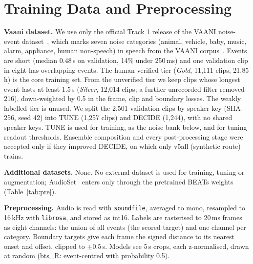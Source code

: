 \documentclass[conference,10pt]{IEEEtran}
\begin{document}
\section{Training Data and Preprocessing}
\textbf{Vaani dataset.} We use only the official Track 1 release of the VAANI noise-event dataset~\cite{vaani_ned}, which marks seven noise categories (animal, vehicle, baby, music, alarm, appliance, human non-speech) in speech from the VAANI corpus~\cite{vaani}. Events are short (median 0.48\,s on validation, 14\% under 250\,ms) and one validation clip in eight has overlapping events. The human-verified tier (\emph{Gold}, 11{,}111 clips, 21.85\,h) is the core training set. From the unverified tier we keep clips whose longest event lasts at least 1.5\,s (\emph{Silver}, 12{,}014 clips; a further unrecorded filter removed 216), down-weighted by 0.5 in the frame, clip and boundary losses. The weakly labelled tier is unused. We split the 2{,}501 validation clips by speaker key (SHA-256, seed 42) into TUNE (1{,}257 clips) and DECIDE (1{,}244), with no shared speaker keys. TUNE is used for training, as the noise bank below, and for tuning readout thresholds. Ensemble composition and every post-processing stage were accepted only if they improved DECIDE, on which only v5all (synthetic route) trains.

\textbf{Additional datasets.} None. No external dataset is used for training, tuning or augmentation; AudioSet~\cite{audioset,audioset_strong} enters only through the pretrained BEATs weights (Table~\ref{tab:pre}).

\textbf{Preprocessing.} Audio is read with \texttt{soundfile}, averaged to mono, resampled to 16\,kHz with \texttt{librosa}, and stored as int16. Labels are rasterised to 20\,ms frames as eight channels: the union of all events (the scored target) and one channel per category. Boundary targets give each frame the signed distance to its nearest onset and offset, clipped to $\pm0.5$\,s. Models see 5\,s crops, each z-normalised, drawn at random (bts\_R: event-centred with probability 0.5).
\end{document}
